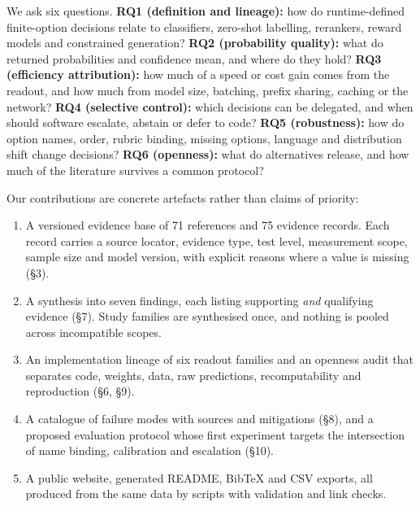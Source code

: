We ask six questions. \textbf{RQ1 (definition and lineage):} how do runtime-defined finite-option decisions relate to classifiers, zero-shot labelling, rerankers, reward models and constrained generation? \textbf{RQ2 (probability quality):} what do returned probabilities and confidence mean, and where do they hold? \textbf{RQ3 (efficiency attribution):} how much of a speed or cost gain comes from the readout, and how much from model size, batching, prefix sharing, caching or the network? \textbf{RQ4 (selective control):} which decisions can be delegated, and when should software escalate, abstain or defer to code? \textbf{RQ5 (robustness):} how do option names, order, rubric binding, missing options, language and distribution shift change decisions? \textbf{RQ6 (openness):} what do alternatives release, and how much of the literature survives a common protocol?

Our contributions are concrete artefacts rather than claims of priority:

\begin{enumerate}[leftmargin=*,itemsep=2pt]
  \item A versioned evidence base of 71 references and 75 evidence records. Each record carries a source locator, evidence type, test level, measurement scope, sample size and model version, with explicit reasons where a value is missing (§3).
  \item A synthesis into seven findings, each listing supporting \emph{and} qualifying evidence (§7). Study families are synthesised once, and nothing is pooled across incompatible scopes.
  \item An implementation lineage of six readout families and an openness audit that separates code, weights, data, raw predictions, recomputability and reproduction (§6, §9).
  \item A catalogue of failure modes with sources and mitigations (§8), and a proposed evaluation protocol whose first experiment targets the intersection of name binding, calibration and escalation (§10).
  \item A public website, generated README, BibTeX and CSV exports, all produced from the same data by scripts with validation and link checks.
\end{enumerate}
